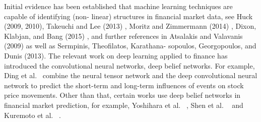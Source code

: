 
Initial evidence has been established that machine learning techniques are capable of identifying (non- linear) structures in financial market data, see Huck (2009, 2010),  
Takeuchi and Lee (2013) , Moritz and Zimmermann (2014) , Dixon, Klabjan, and Bang (2015) , and further references in Atsalakis and Valavanis (2009) as well as Sermpinis, Theofilatos, Karathana- sopoulos, Georgopoulos, and Dunis (2013). The relevant work on deep learning applied to finance has introduced the convolutional neural networks, deep belief networks. For example, Ding et al.~\cite{ding2015deep} combine the neural tensor network and the deep convolutional neural network to predict the short-term and long-term influences of events on stock price movements. Other than that, certain works use deep belief networks in financial market prediction, for example, Yoshihara et al. ~\cite{yoshihara2014predicting}, Shen et al. ~\cite{shen2015forecasting} and Kuremoto et al. ~\cite{kuremoto2014time}.
 